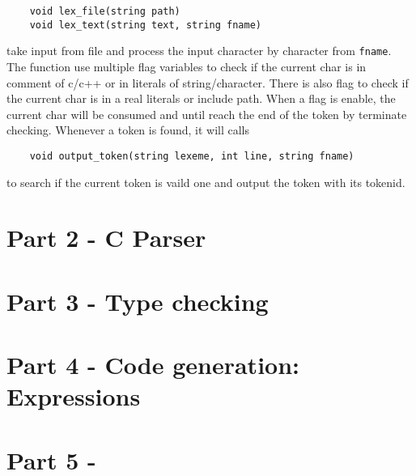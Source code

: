 \documentclass{article}
\begin{document}
\begin{verbatim}
	void lex_file(string path)
	void lex_text(string text, string fname)
\end{verbatim}
take input from file and process the input character by character from {\tt fname}.
The function use multiple flag variables to check if the 
current char is in comment of c/c++ or in literals of string/character.
There is also flag to check if the current char is in a real literals or include path.
When a flag is enable, the current char will be consumed and until 
reach the end of the token by terminate checking.
Whenever a token is found, it will calls
\begin{verbatim}
	void output_token(string lexeme, int line, string fname)
\end{verbatim}
to search if the current token is vaild one and output the token with its tokenid.






\section{Part 2 - C Parser}

\section{Part 3 - Type checking}

\section{Part 4 - Code generation: Expressions}

\section{Part 5 - }
\end{document}
